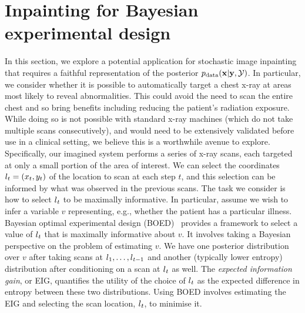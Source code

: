 \section{Inpainting for Bayesian experimental design} \label{sec:cigcvae-boed}

In this section, we explore a potential application for stochastic image inpainting that
requires a faithful representation of the posterior $p_{\rm{data}}({\mathbf{x}}|{\mathbf{y}},{\mathcal{Y}})$.
%
In particular, we consider whether it is possible to automatically target a
chest x-ray at areas most likely to reveal abnormalities. This could avoid the
need to scan the entire chest and so bring benefits including reducing the
patient's radiation exposure.
%
While doing so is not possible with standard x-ray machines (which do not take
multiple scans consecutively), and would need to be extensively validated before
use in a clinical setting, we believe this is a worthwhile avenue to explore.
%
Specifically, our imagined system performs a series of x-ray scans, each
targeted at only a small portion of the area of interest. We can select the
coordinates $l_t = (x_t, y_t)$ of the location to scan at each step $t$, and
this selection can be informed by what was observed in the previous scans. The
task we consider is how to select $l{}_t$ to be maximally informative. In
particular, assume we wish to infer a variable $v$ representing, e.g., whether
the patient has a particular illness. Bayesian optimal experimental design
(BOED)~\citep{chaloner1995bayesian} provides a framework to select a value of
$l{}_t$ that is maximally informative about $v$.
%
It involves taking a Bayesian perspective on the problem of estimating $v$. We
have one posterior distribution over $v$ after taking scans at
$l{}_1,\ldots,l{}_{t-1}$ and another (typically lower entropy) distribution after
conditioning on a scan at $l{}_t$ as well.
%
The \textit{expected information gain}, or EIG, quantifies the utility of the
choice of $l{}_t$ as the expected difference in entropy between these two
distributions. Using BOED involves estimating the EIG and selecting the scan
location, $l{}_t$, to minimise it.

